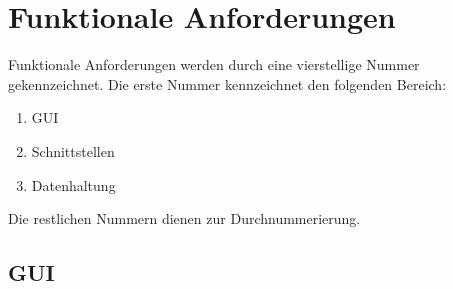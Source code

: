 \documentclass[10pt,a4paper]{article}
\begin{document}
\section{Funktionale Anforderungen}
Funktionale Anforderungen werden durch eine vierstellige Nummer gekennzeichnet. Die erste Nummer kennzeichnet den folgenden Bereich:
\begin{enumerate}
	\item GUI
	\item Schnittstellen
	\item Datenhaltung
\end{enumerate}
Die restlichen Nummern dienen zur Durchnummerierung.

\newpage
\subsection{GUI}
\end{document}
